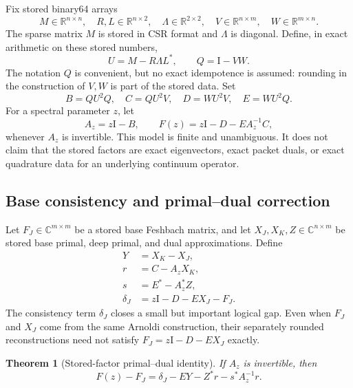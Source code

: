 \documentclass[11pt]{article}
\newtheorem{theorem}{Theorem}[section]
\theoremstyle{definition}
\theoremstyle{remark}
\newcommand{\C}{\mathbb C}
\newcommand{\Id}{\mathrm I}
\begin{document}
Fix stored binary64 arrays
\[
 M\in\mathbb R^{n\times n},\quad
 R,L\in\mathbb R^{n\times2},\quad
 \Lambda\in\mathbb R^{2\times2},\quad
 V\in\mathbb R^{n\times m},\quad
 W\in\mathbb R^{m\times n}.
\]
The sparse matrix \(M\) is stored in CSR format and \(\Lambda\) is
diagonal.  Define, in exact arithmetic on these stored numbers,
\begin{equation}
 U=M-R\Lambda L^*,
 \qquad Q=\Id-VW.
 \label{eq:stored-uq}
\end{equation}
The notation \(Q\) is convenient, but no exact idempotence is assumed:
rounding in the construction of \(V,W\) is part of the stored data.  Set
\begin{equation}
 B=QU^2Q,
 \quad C=QU^2V,
 \quad D=WU^2V,
 \quad E=WU^2Q.
 \label{eq:stored-blocks}
\end{equation}
For a spectral parameter \(z\), let
\begin{equation}
 A_z=z\Id-B,
 \qquad
 F(z)=z\Id-D-EA_z^{-1}C,
 \label{eq:exact-feshbach}
\end{equation}
whenever \(A_z\) is invertible.  This model is finite and unambiguous.  It
does not claim that the stored factors are exact eigenvectors, exact packet
duals, or exact quadrature data for an underlying continuum operator.

\subsection{Base consistency and primal--dual correction}

Let \(F_J\in\C^{m\times m}\) be a stored base Feshbach matrix, and let
\(X_J,X_K,Z\in\C^{n\times m}\) be stored base primal, deep primal, and dual
approximations.  Define
\begin{align}
 Y&=X_K-X_J, \\
 r&=C-A_zX_K, \\
 s&=E^*-A_z^*Z, \\
 \delta_J&=z\Id-D-EX_J-F_J.
 \label{eq:all-defects}
\end{align}
The consistency term \(\delta_J\) closes a small but important logical gap.
Even when \(F_J\) and \(X_J\) come from the same Arnoldi construction,
their separately rounded reconstructions need not satisfy
\(F_J=z\Id-D-EX_J\) exactly.

\begin{theorem}[Stored-factor primal--dual identity]
\label{thm:stored-identity}
If \(A_z\) is invertible, then
\begin{equation}
 F(z)-F_J
 =\delta_J-EY-Z^*r-s^*A_z^{-1}r.
 \label{eq:stored-pd-identity}
\end{equation}
\end{theorem}
\end{document}
